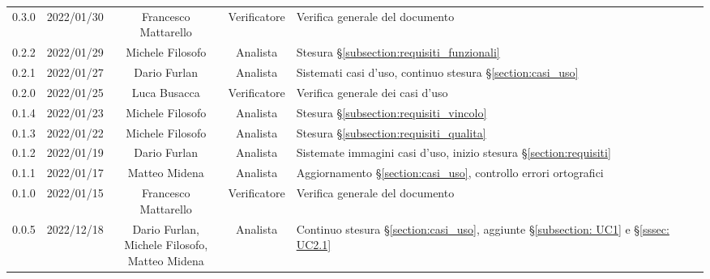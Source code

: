 \begin{center}
\begin{longtable}[c]{c | c | c | c | p{5cm}}
		0.3.0                                                      & 2022/01/30 & Francesco Mattarello      & Verificatore & Verifica generale del documento                                                                         \\
		0.2.2                                                      & 2022/01/29 & Michele Filosofo          & Analista     & Stesura §\ref{subsection:requisiti_funzionali}                                                          \\
		0.2.1                                                      & 2022/01/27 & Dario Furlan              & Analista     & Sistemati casi d'uso, continuo stesura §\ref{section:casi_uso}                                          \\
		0.2.0                                                      & 2022/01/25 & Luca Busacca              & Verificatore & Verifica generale dei casi d'uso                                                                        \\
		0.1.4                                                      & 2022/01/23 & Michele Filosofo          & Analista     & Stesura §\ref{subsection:requisiti_vincolo}                                                             \\
		0.1.3                                                      & 2022/01/22 & Michele Filosofo          & Analista     & Stesura §\ref{subsection:requisiti_qualita}                                                             \\
		0.1.2                                                      & 2022/01/19 & Dario Furlan              & Analista     & Sistemate immagini casi d'uso, inizio stesura §\ref{section:requisiti}                                  \\
		0.1.1                                                      & 2022/01/17 & Matteo Midena             & Analista     & Aggiornamento §\ref{section:casi_uso}, controllo errori ortografici                                     \\
		0.1.0                                                      & 2022/01/15 & Francesco Mattarello      & Verificatore & Verifica generale del documento                                                                         \\
		0.0.5                                                      & 2022/12/18 & \shortstack{Dario Furlan,                                                                                                                          \\ Michele Filosofo,\\ Matteo Midena} & Analista & Continuo stesura §\ref{section:casi_uso}, aggiunte §\ref{subsection: UC1}  e §\ref{sssec: UC2.1}\\

\end{longtable}
\end{center}
